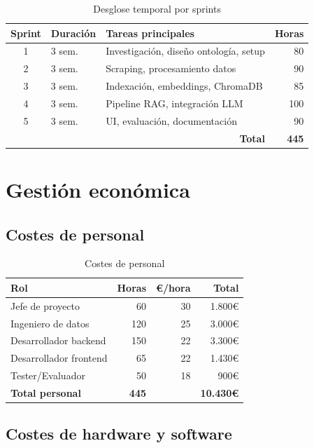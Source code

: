 \documentclass[12pt, a4paper, twoside]{report}
\begin{document}
\begin{table}[H]
\centering
\caption{Desglose temporal por sprints}
\label{tab:sprints-table}
\begin{tabularx}{\textwidth}{clXr}
\toprule
\textbf{Sprint} & \textbf{Duraci\'on} & \textbf{Tareas principales} & \textbf{Horas} \\
\midrule
1 & 3 sem. & Investigaci\'on, dise\~no ontolog\'ia, setup & 80 \\
2 & 3 sem. & Scraping, procesamiento datos & 90 \\
3 & 3 sem. & Indexaci\'on, embeddings, ChromaDB & 85 \\
4 & 3 sem. & Pipeline RAG, integraci\'on LLM & 100 \\
5 & 3 sem. & UI, evaluaci\'on, documentaci\'on & 90 \\
\midrule
\multicolumn{3}{r}{\textbf{Total}} & \textbf{445} \\
\bottomrule
\end{tabularx}
\end{table}

\section{Gesti\'on econ\'omica}

\subsection{Costes de personal}

\begin{table}[H]
\centering
\caption{Costes de personal}
\label{tab:costes-personal}
\begin{tabular}{lrrr}
\toprule
\textbf{Rol} & \textbf{Horas} & \textbf{\euro/hora} & \textbf{Total} \\
\midrule
Jefe de proyecto & 60 & 30 & 1.800\euro \\
Ingeniero de datos & 120 & 25 & 3.000\euro \\
Desarrollador backend & 150 & 22 & 3.300\euro \\
Desarrollador frontend & 65 & 22 & 1.430\euro \\
Tester/Evaluador & 50 & 18 & 900\euro \\
\midrule
\textbf{Total personal} & \textbf{445} & & \textbf{10.430\euro} \\
\bottomrule
\end{tabular}
\end{table}

\subsection{Costes de hardware y software}
\end{document}
